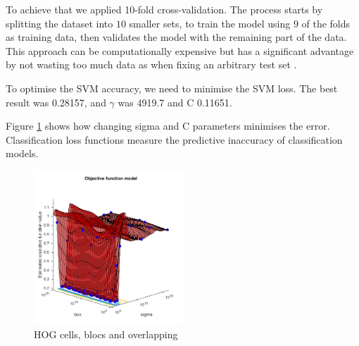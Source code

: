 To achieve that we applied 10-fold cross-validation. The process starts by splitting the dataset into $10$ smaller sets, to train the model using $9$ of the folds as training data, then validates the model with the remaining part of the data. This approach can be computationally expensive but has a significant advantage by not wasting too much data as when fixing an arbitrary test set \citep{hsu2003practical}.

To optimise the SVM accuracy, we need to minimise the SVM loss. The best result was 0.28157, and $\gamma$ was 4919.7 and C 0.11651.



Figure \ref{fig:opt1} shows how changing sigma and C parameters minimises the error. Classification loss functions measure the predictive inaccuracy of classification models. 

%


\begin{figure}[]
	\centering
	\includegraphics[width=0.5\textwidth]{Chapter4/Figs/MaskedOptimIteration2.png}
	\caption{HOG cells, blocs and overlapping}
	\label{fig:opt1}
\end{figure}


